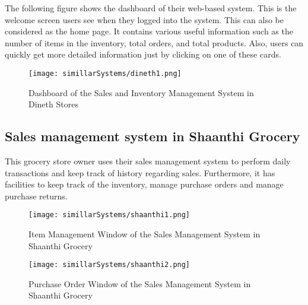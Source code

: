 \documentclass[12pt]{report}
\begin{document}
The following figure shows the dashboard of their web-based system. This is the welcome screen users see when they logged into the system. This can also be considered as the home page. It contains various useful information such as the number of items in the inventory, total orders, and total products. Also, users can quickly get more detailed information just by clicking on one of these cards.

\begin{figure}[H]
	\centering
	\texttt{[image: simillarSystems/dineth1.png]}
	\caption{Dashboard of the Sales and Inventory Management System in Dineth Stores}
\end{figure}

\subsection{Sales management system in Shaanthi Grocery}

This grocery store owner uses their sales management system to perform daily transactions and keep track of history regarding sales.  Furthermore, it has facilities to keep track of the inventory, manage purchase orders and manage purchase returns.

\begin{figure}[H]
	\centering
	\texttt{[image: simillarSystems/shaanthi1.png]}
	\caption{Item Management Window of the Sales Management System in Shaanthi Grocery}
\end{figure}

\begin{figure}[H]
	\centering
	\texttt{[image: simillarSystems/shaanthi2.png]}
	\caption{Purchase Order Window of the Sales Management System in Shaanthi Grocery}
\end{figure}
\end{document}
